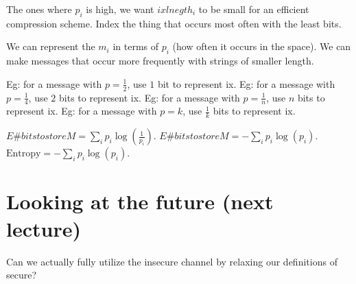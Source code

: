 The ones where $p_i$ is high, we want $ixlnegth_i$ to be small for an efficient compression scheme.
Index the thing that occurs most often with the least bits.

We can represent the  $m_i$ in terms of $p_i$ (how often it occurs in the space).
We can make messages that occur more frequently with strings of smaller length.

Eg: for a message with $p = \frac{1}{2}$, use $1$ bit to represent ix.
Eg: for a message with $p = \frac{1}{4}$, use $2$ bits to represent ix.
Eg: for a message with $p = \frac{1}{n}$, use $n$ bits to represent ix.
Eg: for a message with $p = k$, use $\frac{1}{k}$ bits to represent ix.

$E{\#bits to store M} =  \sum_{i}p_i \log(\frac{1}{p_i})$.
$E{\#bits to store M} = - \sum_{i}p_i \log(p_i)$.
$\text{Entropy} = - \sum_{i}p_i \log(p_i)$.


\section{Looking at the future (next lecture)}

Can we actually fully utilize the insecure channel by relaxing our definitions of secure?

